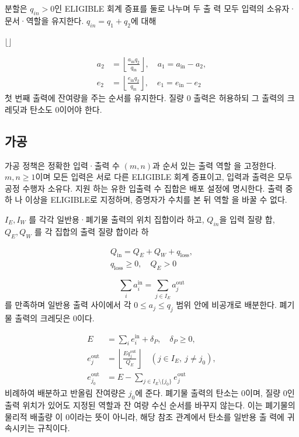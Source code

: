 분할은 \(q_{in}>0\)인 ELIGIBLE 회계 증표를 둘로 나누며 두 출
력 모두 입력의 소유자·문서·역할을 유지한다. \(q_{in}=q_{1}+q_{2}\)에
대해

\(⌊⌋\)

\begin{equation}
    \begin{aligned}a_2&=\left\lfloor\frac{a_{\mathrm{in}}q_2}{q_{\mathrm{in}}}\right\rfloor,\quad a_1=a_{\mathrm{in}}-a_2,\\e_2&=\left\lfloor\frac{e_{\mathrm{in}}q_2}{q_{\mathrm{in}}}\right\rfloor,\quad e_1=e_{\mathrm{in}}-e_2\end{aligned}\tag{16}
\end{equation}
첫 번째 출력에 잔여량을 주는 순서를 유지한다. 질량 0 출력은
허용하되 그 출력의 크레딧과 탄소도 0이어야 한다.

\subsection{가공}
가공 정책은 정확한 입력·출력 수 \((m,n)\)과 순서 있는 출력 역할
을 고정한다. \(m,n≥1\)이며 모든 입력은 서로 다른 ELIGIBLE
회계 증표이고, 입력과 출력은 모두 공정 수행자 소유다. 지원
하는 유한 입출력 수 집합은 배포 설정에 명시한다. 출력 중 하
나 이상을 ELIGIBLE로 지정하며, 증명자가 수치를 본 뒤 역할
을 바꿀 수 없다.

\(I_{E},I_{W}\) 를 각각 일반용·폐기물 출력의 위치 집합이라 하고,
\(Q_{in}\)을 입력 질량 합, \(Q_{E},Q_{W}\) 를 각 집합의 출력 질량 합이라 하

\begin{equation}
    \begin{gathered}Q_{\mathrm{in}}=Q_E+Q_W+q_{\mathrm{loss}},\\q_{\mathrm{loss}}\ge0,\quad Q_E>0\end{gathered}\tag{17}
\end{equation}

\begin{equation}
    \sum_i a_i^{\mathrm{in}}=\sum_{j\in I_E}a_j^{\mathrm{out}}\tag{18}
\end{equation}
를 만족하며 일반용 출력 사이에서 각 \(0≤a_{j}≤q_{j}\) 범위 안에
비공개로 배분한다. 폐기물 출력의 크레딧은 0이다.

\begin{equation}
    \begin{aligned}E&=\sum_i e_i^{\mathrm{in}}+\delta_P,\quad\delta_P\ge0,\\e_j^{\mathrm{out}}&=\left\lfloor\frac{E q_j^{\mathrm{out}}}{Q_E}\right\rfloor\quad(j\in I_E,\ j\ne j_0),\\e_{j_0}^{\mathrm{out}}&=E-\sum_{j\in I_E\setminus\{j_0\}}e_j^{\mathrm{out}}\end{aligned}\tag{19}
\end{equation}
비례하여 배분하고 반올림 잔여량은 \(j_{0}\)에 준다. 폐기물 출력의
탄소는 0이며, 질량 0인 출력 위치가 있어도 지정된 역할과 잔
여량 수신 순서를 바꾸지 않는다. 이는 폐기물의 물리적 배출량
이 0이라는 뜻이 아니라, 해당 참조 관계에서 탄소를 일반용 출
력에 귀속시키는 규칙이다.

